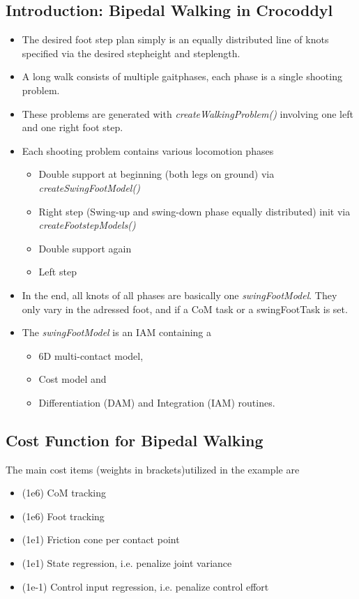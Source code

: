 \subsection{Introduction: Bipedal Walking in Crocoddyl}
\begin{itemize}
\item The desired foot step plan simply is an equally distributed line of knots specified via the desired stepheight and steplength. 
\item A long walk consists of multiple gaitphases, each phase is a single shooting problem.
\item These problems are generated with \textit{createWalkingProblem()} involving one left and one right foot step.
\item Each shooting problem contains various locomotion phases
	\begin{itemize}
	\item Double support at beginning (both legs on ground) via \textit{createSwingFootModel()}
	\item Right step (Swing-up and swing-down phase equally distributed) init via    	\textit{createFootstepModels()}
	\item Double support again
	\item Left step
	\end{itemize}	
\item In the end, all knots of all phases are basically one \textit{swingFootModel}. They only vary in the adressed foot, and if a CoM task or a swingFootTask is set.
\item The \textit{swingFootModel} is an IAM containing a 
	\begin{itemize}
	\item 6D multi-contact model,
	\item Cost model and
	\item Differentiation (DAM) and Integration (IAM) routines.
	\end{itemize}
\end{itemize}

\subsection{Cost Function for Bipedal Walking}
The main cost items (weights in brackets)utilized in the example are 
\begin{itemize}
\item (1e6) CoM tracking
\item (1e6) Foot tracking
\item (1e1) Friction cone per contact point
\item (1e1) State regression, i.e. penalize joint variance
\item (1e-1) Control input regression, i.e. penalize control effort
\end{itemize}

